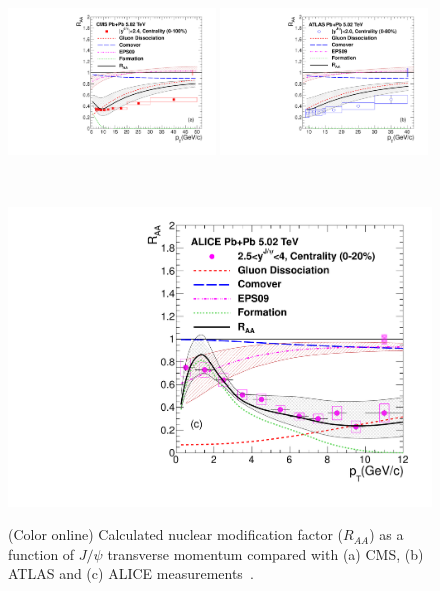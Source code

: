 \documentclass[12pt,a4paper,final]{iopart} %
\newcommand{\Jpsi}{J/\psi}
\begin{document}
\begin{figure}
\begin{minipage}{1.0\linewidth}
\centering
{\includegraphics[width=0.49\textwidth]{Fig5a_CMS_RAAPt_Shade.pdf}}
{\includegraphics[width=0.49\textwidth]{Fig5b_ATLAS_RAAPt_Shade.pdf}}
\end{minipage}%
\ \\
\centering
\begin{minipage}{0.5\linewidth}
\centering
{\includegraphics[width=1.0\textwidth]{Fig5c_ALICE_RAAPt_Shade.pdf}}
\end{minipage}%
\caption{(Color online)
Calculated nuclear modification factor ($R_{AA}$) as a function of $\Jpsi$ 
transverse momentum compared with (a) CMS, (b) ATLAS and (c) ALICE
measurements~\cite{Sirunyan:2017isk,ATLAS:2016qpn,Adam:2016rdg}.}
\label{fig:JPsiRaaVsPt}
\end{figure}
\end{document}
